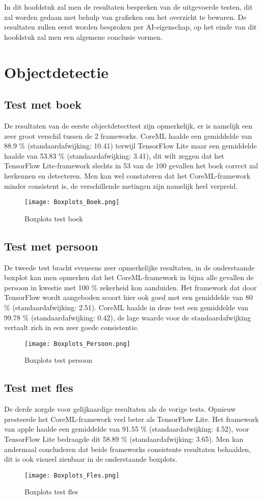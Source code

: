 In dit hoofdstuk zal men de resultaten bespreken van de uitgevoerde testen, dit zal worden gedaan met behulp van grafieken om het overzicht te bewaren. De resultaten zullen eerst worden besproken per AI-eigenschap, op het einde van dit hoofdstuk zal men een algemene conclusie vormen.

\section{Objectdetectie}

\subsection{Test met boek}
De resultaten van de eerste objectdetecttest zijn opmerkelijk, er is namelijk een zeer groot verschil tussen de 2 frameworks. CoreML haalde een gemiddelde van 88.9 \% (standaardafwijking: 10.41) terwijl TensorFlow Lite maar een gemiddelde haalde van 53.83 \% (standaardafwijking: 3.41), dit wilt zeggen dat het TensorFlow Lite-framework slechts in 53 van de 100 gevallen het boek correct zal herkennen en detecteren. Men kan wel constateren dat het CoreML-framework minder consistent is, de verschillende metingen zijn namelijk heel verpreid.

\begin{figure}[H]
	\centering
	\texttt{[image: Boxplots\_Boek.png]}
	\caption{Boxplots test boek}
\end{figure}
\subsection{Test met persoon}

De tweede test bracht eveneens zeer opmerkelijke resultaten, in de onderstaande boxplot kan men opmerken dat het CoreML-framework in bijna alle gevallen de persoon in kwestie met 100 \% zekerheid kon aanduiden. Het framework dat door TensorFlow wordt aangeboden scoort hier ook goed met een gemiddelde van 80 \% (standaardafwijking: 2.51). CoreML haalde in deze test een gemiddelde van 99.78 \% (standaardafwijking: 0.42), de lage waarde voor de standaardafwijking vertaalt zich in een zeer goede consistentie.
\begin{figure}[H]
	\centering
	\texttt{[image: Boxplots\_Persoon.png]}
	\caption{Boxplots test persoon}
\end{figure}

\subsection{Test met fles}
De derde zorgde voor gelijkaardige resultaten als de vorige tests. Opnieuw presteerde het CoreML-framework veel beter als TensorFlow Lite. Het framework van apple haalde een gemiddelde van 91.55 \% (standaardafwijking: 4.52), voor TensorFlow Lite bedraagde dit 58.89 \% (standaardafwijking: 3.65). Men kan andermaal concluderen dat beide frameworks consistente resultaten behaalden, dit is ook visueel zienbaar in de onderstaande boxplots. 
\begin{figure}[H]
	\centering
	\texttt{[image: Boxplots\_Fles.png]}
	\caption{Boxplots test fles}
\end{figure}

